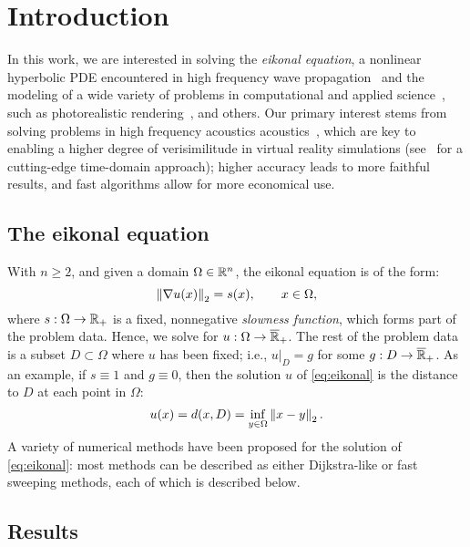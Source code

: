 \documentclass[eikonal.tex]{subfiles}
\begin{document}
\section{Introduction}\label{sec:introduction}

In this work, we are interested in solving the \emph{eikonal
  equation}, a nonlinear hyperbolic PDE encountered in high frequency
wave propagation~\cite{engquist2003computational} and the modeling of
a wide variety of problems in computational and applied
science~\cite{sethian1999level}, such as photorealistic
rendering~\cite{ihrke2007eikonal}, and others. Our primary interest
stems from solving problems in high frequency acoustics
acoustics~\cite{prislan2016ray}, which are key to enabling a higher
degree of verisimilitude in virtual reality simulations
(see~\cite{raghuvanshi2014parametric,raghuvanshi2018parametric} for a
cutting-edge time-domain approach); higher accuracy leads to more
faithful results, and fast algorithms allow for more economical use.

\subsection{The eikonal equation}

With $n \geq 2$, and given a domain $\Omega \in \mathbb{R}^n$, the eikonal
equation is of the form:
\begin{equation}\label{eq:eikonal}
  \norm{\nabla u(x)}_2 = s(x), \qquad x \in \Omega,
\end{equation}
where $s : \Omega \to \mathbb{R}_+$ is a fixed, nonnegative \emph{slowness
  function}, which forms part of the problem data. Hence, we solve for
$u : \Omega \to \overline{\mathbb{R}}_+$. The rest of the problem data is a
subset $D \subset \Omega$ where $u$ has been fixed; i.e.,
$\left. u \right|_D = g$ for some $g : D \to \overline{\mathbb{R}}_+$. As an
example, if $s \equiv 1$ and $g \equiv 0$, then the solution $u$ of
\cref{eq:eikonal} is the distance to $D$ at each point in $\Omega$:
\begin{equation}
  \label{eq:distance-to-Omega}
  u(x) = d(x, D) = \inf_{y \in \Omega} \norm{x - y}_2.
\end{equation}
A variety of numerical methods have been proposed for the solution of
\cref{eq:eikonal}: most methods can be described as either
Dijkstra-like or fast sweeping methods, each of which is described
below.

\subsection{Results}
\end{document}
